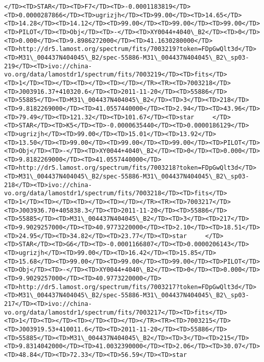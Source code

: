 \documentclass[11pt]{article}
\begin{document}
\begin{Verbatim}[commandchars=\\\{\}]
</TD><TD>STAR</TD><TD>F7</TD><TD>-0.0001183819</TD><TD>0.0000287866</TD><TD>ugrizjh</TD><TD>99.00</TD><TD>14.65</TD><TD>14.28</TD><TD>14.12</TD><TD>99.00</TD><TD>99.00</TD><TD>99.00</TD><TD>PILOT</TD><TD>Obj</TD><TD>-</TD><TD>XY0044+4040\_B2</TD><TD>0</TD><TD>0.000</TD><TD>9.8986272000</TD><TD>41.1630280000</TD><TD>http://dr5.lamost.org/spectrum/fits/7003219?token=FDpGwQlt3d</TD><TD>M31\_004437N404045\_B2/spec-55886-M31\_004437N404045\_B2\_sp03-219</TD><TD>ivo://china-vo.org/data/lamostdr1/spectrum/fits/7003219</TD><TD>fits</TD><TD>1</TD><TD></TD><TD></TD><TD></TD></TR><TR><TD>7003218</TD><TD>J003916.37+410320.6</TD><TD>2011-11-20</TD><TD>55886</TD><TD>55885</TD><TD>M31\_004437N404045\_B2</TD><TD>3</TD><TD>218</TD><TD>9.8182269000</TD><TD>41.0557440000</TD><TD>2.94</TD><TD>43.96</TD><TD>79.49</TD><TD>121.32</TD><TD>101.67</TD><TD>star     </TD><TD>STAR</TD><TD>K5</TD><TD>-0.0000635440</TD><TD>0.0000186129</TD><TD>ugrizjh</TD><TD>99.00</TD><TD>15.01</TD><TD>13.92</TD><TD>13.50</TD><TD>99.00</TD><TD>99.00</TD><TD>99.00</TD><TD>PILOT</TD><TD>Obj</TD><TD>-</TD><TD>XY0044+4040\_B2</TD><TD>0</TD><TD>0.000</TD><TD>9.8182269000</TD><TD>41.0557440000</TD><TD>http://dr5.lamost.org/spectrum/fits/7003218?token=FDpGwQlt3d</TD><TD>M31\_004437N404045\_B2/spec-55886-M31\_004437N404045\_B2\_sp03-218</TD><TD>ivo://china-vo.org/data/lamostdr1/spectrum/fits/7003218</TD><TD>fits</TD><TD>1</TD><TD></TD><TD></TD><TD></TD></TR><TR><TD>7003217</TD><TD>J003936.70+405838.3</TD><TD>2011-11-20</TD><TD>55886</TD><TD>55885</TD><TD>M31\_004437N404045\_B2</TD><TD>3</TD><TD>217</TD><TD>9.9029257000</TD><TD>40.9773220000</TD><TD>2.10</TD><TD>18.51</TD><TD>24.95</TD><TD>34.82</TD><TD>23.77</TD><TD>star     </TD><TD>STAR</TD><TD>G6</TD><TD>-0.0001166807</TD><TD>0.0000206143</TD><TD>ugrizjh</TD><TD>99.00</TD><TD>16.42</TD><TD>15.85</TD><TD>15.68</TD><TD>99.00</TD><TD>99.00</TD><TD>99.00</TD><TD>PILOT</TD><TD>Obj</TD><TD>-</TD><TD>XY0044+4040\_B2</TD><TD>0</TD><TD>0.000</TD><TD>9.9029257000</TD><TD>40.9773220000</TD><TD>http://dr5.lamost.org/spectrum/fits/7003217?token=FDpGwQlt3d</TD><TD>M31\_004437N404045\_B2/spec-55886-M31\_004437N404045\_B2\_sp03-217</TD><TD>ivo://china-vo.org/data/lamostdr1/spectrum/fits/7003217</TD><TD>fits</TD><TD>1</TD><TD></TD><TD></TD><TD></TD></TR><TR><TD>7003215</TD><TD>J003919.53+410011.6</TD><TD>2011-11-20</TD><TD>55886</TD><TD>55885</TD><TD>M31\_004437N404045\_B2</TD><TD>3</TD><TD>215</TD><TD>9.8314042000</TD><TD>41.0032390000</TD><TD>2.06</TD><TD>30.07</TD><TD>48.84</TD><TD>72.33</TD><TD>56.59</TD><TD>star     
\end{Verbatim}
\end{document}
